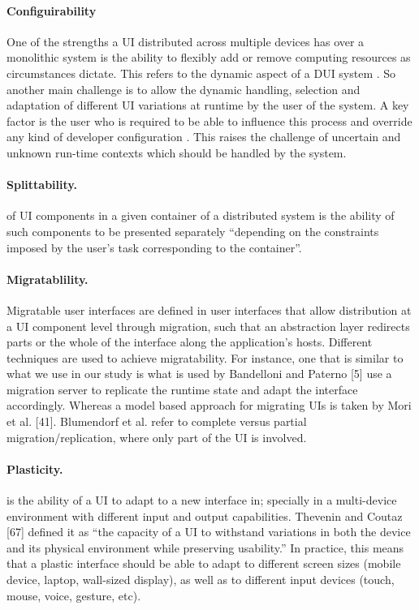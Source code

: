 \paragraph{Configuirability} 
One of the strengths a UI distributed across multiple
devices has over a monolithic system is the ability to flexibly add or remove
computing resources as circumstances dictate. This refers to the dynamic
aspect of a DUI system \cite{chen2011distributed}. So another main challenge is to allow the dynamic handling, selection and adaptation of different UI
variations at runtime by the user of the system. A key factor is the user who is
required to be able to influence this process and override any kind of developer
configuration \cite{blumendorf2011distributed}. This raises the
challenge of uncertain and unknown run-time contexts which should be handled
by the system.
\paragraph{Splittability.} of UI components in a given container of a
distributed system is the ability of such components to be presented separately ``depending on the
constraints imposed by the user’s task corresponding to the container''.\cite{demeure20084c}
\paragraph{Migratablility.} Migratable user interfaces are defined in
\cite{elmqvist2011distributed} user interfaces that allow distribution at a UI component level through migration,
such that an abstraction layer redirects parts or the whole of the interface
along the application's hosts. Different techniques are used to achieve
migratability. For instance, one that is similar to what we use in our study is
what is used by Bandelloni and Paterno [5] use a migration server to replicate
the runtime state and adapt the interface accordingly. Whereas a model based
approach for migrating UIs is taken by Mori et al. [41]. Blumendorf et al.
\cite{blumendorf2011distributed} refer to complete versus partial migration/replication, where only part of the UI is involved.
\paragraph{Plasticity.} is the ability of a UI to
adapt to a new interface in; specially in a multi-device environment with
different input and output capabilities. Thevenin and Coutaz [67]  defined it as ``the capacity of a UI to withstand variations in both the device and its physical environment while preserving usability.''
In practice, this means that a plastic interface should be able to adapt to different screen sizes (mobile device, laptop, wall-sized display), as well as to different input devices (touch, mouse, voice, gesture, etc).

